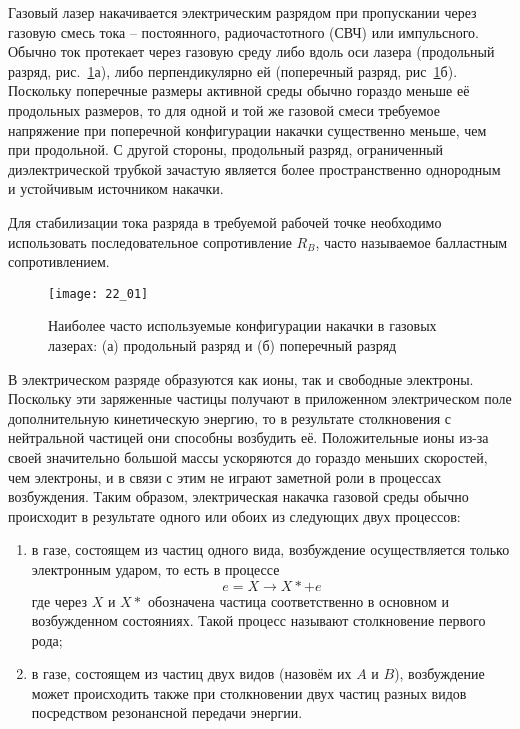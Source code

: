 
Газовый лазер накачивается электрическим разрядом при пропускании через 
газовую смесь тока -- постоянного, радиочастотного (СВЧ) или импульсного. 
Обычно ток протекает через газовую среду либо вдоль оси лазера 
(продольный разряд, рис.~\ref{img22.1}а), либо перпендикулярно ей (поперечный 
разряд, рис~\ref{img22.1}б). Поскольку поперечные размеры активной среды 
обычно гораздо меньше её продольных размеров, то для одной и той же газовой 
смеси требуемое напряжение при поперечной конфигурации накачки существенно 
меньше, чем при продольной. С другой стороны, продольный разряд, ограниченный 
диэлектрической трубкой зачастую является более пространственно однородным и 
устойчивым источником накачки. 

Для стабилизации тока разряда в требуемой рабочей точке необходимо 
использовать последовательное сопротивление \( R_B \), часто называемое 
балластным сопротивлением. 

\begin{figure}[h!]
    \center
    \texttt{[image: 22\_01]}
    \caption{Наиболее часто используемые конфигурации накачки в газовых 
    	лазерах: (а) продольный разряд и (б) поперечный разряд}
    \label{img22.1}
\end{figure}

В электрическом разряде образуются как ионы, так и свободные электроны. 
Поскольку эти заряженные частицы получают в приложенном электрическом поле 
дополнительную кинетическую энергию, то в результате столкновения с 
нейтральной частицей они способны возбудить её. Положительные ионы из-за 
своей значительно большой массы ускоряются до гораздо меньших скоростей, чем 
электроны, и в связи с этим не играют заметной роли в процессах возбуждения. 
Таким образом, электрическая накачка газовой среды обычно происходит в 
результате одного или обоих из следующих двух процессов:
\begin{enumerate}
	\item в газе, состоящем из частиц одного вида, возбуждение осуществляется 
		только электронным ударом, то есть в процессе 
		\[ e = X \rightarrow X* + e \]
		где через \( X \) и \( X* \) обозначена частица соответственно в 
		основном и возбужденном состояниях. Такой процесс называют 
		столкновение первого рода;
	\item в газе, состоящем из частиц двух видов (назовём их \( A \) и 
		\( B \)), возбуждение может происходить также при столкновении двух 
		частиц разных видов посредством резонансной передачи энергии.
\end{enumerate}

